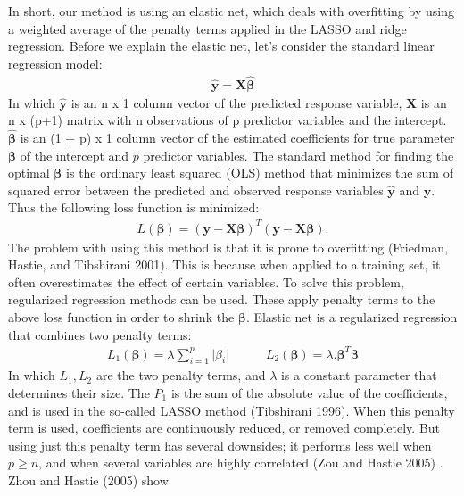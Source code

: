 \documentclass[
]{article}
\begin{document}
In short, our method is using an elastic net, which deals with
overfitting by using a weighted average of the penalty terms applied in
the LASSO and ridge regression. Before we explain the elastic net, let's
consider the standard linear regression model: \begin{align*}
    \hat{\boldsymbol{y}} = \mathbf{X}\boldsymbol{\hat{\beta}}
\end{align*} In which \(\hat{\boldsymbol{y}}\) is an n x 1 column vector
of the predicted response variable, \(\mathbf{X}\) is an n x (p+1)
matrix with n observations of p predictor variables and the intercept.
\(\boldsymbol{\hat{\beta}}\) is an (1 + p) x 1 column vector of the
estimated coefficients for true parameter \(\boldsymbol{{\beta}}\) of
the intercept and \(p\) predictor variables. The standard method for
finding the optimal \(\boldsymbol{\beta}\) is the ordinary least squared
(OLS) method that minimizes the sum of squared error between the
predicted and observed response variables \(\hat{\boldsymbol{y}}\) and
\({\boldsymbol{y}}\). Thus the following loss function is minimized:
\begin{align*}
    L(\boldsymbol{\beta}) = (\boldsymbol{y} - \mathbf{X}\boldsymbol{\beta})^T(\boldsymbol{y} - \mathbf{X}\boldsymbol{\beta}).
\end{align*} The problem with using this method is that it is prone to
overfitting (Friedman, Hastie, and Tibshirani 2001). This is because
when applied to a training set, it often overestimates the effect of
certain variables. To solve this problem, regularized regression methods
can be used. These apply penalty terms to the above loss function in
order to shrink the \(\boldsymbol{\beta}\). Elastic net is a regularized
regression that combines two penalty terms: \begin{align*}
    L_1(\boldsymbol{\beta}) = \lambda \sum_{i=1}^{p} \vert \beta_i \vert \hspace{35pt} L_2(\boldsymbol{\beta}) = \lambda. \boldsymbol{\beta}^T\boldsymbol{\beta}
\end{align*} In which \(L_1, L_2\) are the two penalty terms, and
\(\lambda\) is a constant parameter that determines their size. The
\(P_1\) is the sum of the absolute value of the coefficients, and is
used in the so-called LASSO method (Tibshirani 1996). When this penalty
term is used, coefficients are continuously reduced, or removed
completely. But using just this penalty term has several downsides; it
performs less well when \(p \geq n\), and when several variables are
highly correlated (Zou and Hastie 2005) . Zhou and Hastie (2005) show
\end{document}
